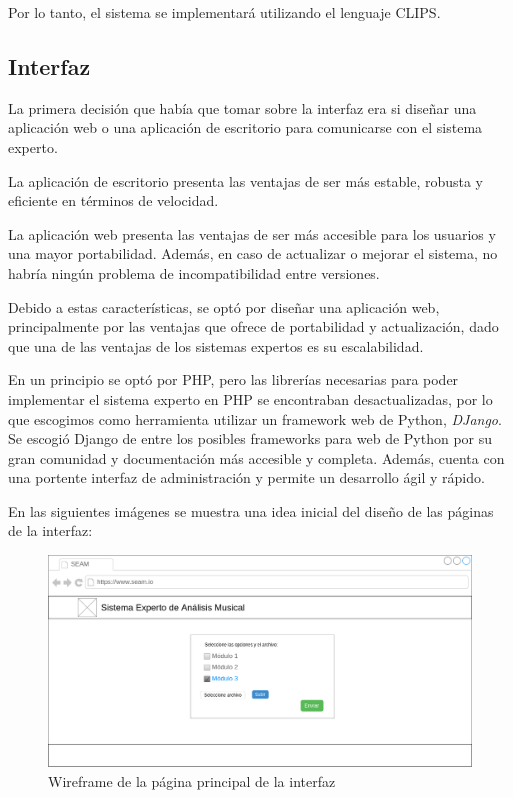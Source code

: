 Por lo tanto, el sistema se implementará utilizando el lenguaje CLIPS.

\subsection{Interfaz}

La primera decisión que había que tomar sobre la interfaz era si diseñar una aplicación web o una aplicación de escritorio para comunicarse con el sistema experto. 

\bigskip
La aplicación de escritorio presenta las ventajas de ser más estable, robusta y eficiente en términos de velocidad.

\bigskip
La aplicación web presenta las ventajas de ser más accesible para los usuarios y una mayor portabilidad. Además, en caso de actualizar o mejorar el sistema, no habría ningún problema de incompatibilidad entre versiones. 

\bigskip
Debido a estas características, se optó por diseñar una aplicación web, principalmente por las ventajas que ofrece de portabilidad y actualización, dado que una de las ventajas de los sistemas expertos es su escalabilidad. 

\bigskip
 En un principio se optó por PHP, pero las librerías necesarias para poder implementar el sistema experto en PHP se encontraban desactualizadas, por lo que escogimos como herramienta utilizar un framework web de Python, \textit{DJango}. Se escogió Django de entre los posibles frameworks para web de Python por su gran comunidad y documentación más accesible y completa. Además, cuenta con una portente interfaz de administración y permite un desarrollo ágil y rápido.

 En las siguientes imágenes se muestra una idea inicial del diseño de las páginas de la interfaz:

 \begin{figure}[H]
 	\centering
	\includegraphics[scale=0.4]{imagenes/interfaz1.png}
	\caption{Wireframe de la página principal de la interfaz}
	\label{fig4.1.2.1}
\end{figure}


